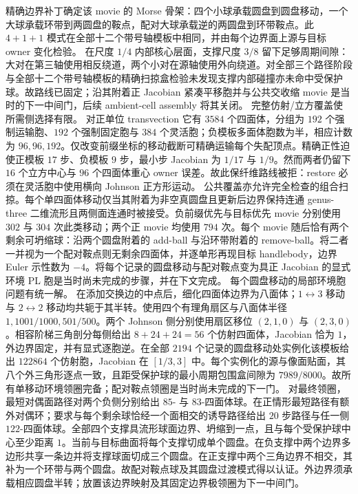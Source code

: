 \documentclass[11pt]{amsart}
\theoremstyle{definition}
\theoremstyle{remark}
\begin{document}
精确边界补丁确定该 movie 的 Morse 骨架：四个小球承载圆盘到圆盘移动，一个大球承载环带到两圆盘的鞍点，配对大球承载逆的两圆盘到环带鞍点。此 $4+1+1$ 模式在全部十二个带号轴模板中相同，并由每个边界面上源与目标 owner 变化检验。
在尺度 $1/4$ 内部核心层面，支撑尺度 $3/8$ 留下足够周期间隙：大对在第三轴使用相反绕道，两个小对在源轴使用外向绕道。对全部三个路径阶段与全部十二个带号轴模板的精确扫掠盒检验未发现支撑内部碰撞亦未命中受保护球。故路线已固定；沿其附着正 Jacobian 紧凑平移胞并与公共交收缩 movie 是当时的下一中间门，后续 ambient-cell assembly 将其关闭。
完整仿射/立方覆盖使所需侧选择有限。
对正单位 transvection 它有 $3584$ 个四面体，分组为 $192$ 个强制运输胞、$192$ 个强制固定胞与 $384$ 个灵活胞；负模板多面体胞数为半，相应计数为 $96,96,192$。仅改变前缀坐标的移动截断可精确运输每个失配顶点。精确正性迫使正模板 $17$ 步、负模板 $9$ 步，最小步 Jacobian 为 $1/17$ 与 $1/9$。然而两者仍留下 $16$ 个立方中心与 $96$ 个四面体重心 owner 误差。故此保纤维路线被拒：restore 必须在灵活胞中使用横向 Johnson 正方形运动。
公共覆盖亦允许完全检查的组合扫掠。每个单四面体移动仅当其附着为非空真圆盘且更新后边界保持连通 genus-three 二维流形且两侧面连通时被接受。负前缀优先与目标优先 movie 分别使用 $302$ 与 $304$ 次此类移动；两个正 movie 均使用 $794$ 次。每个 movie 随后恰有两个剩余可坍缩球：沿两个圆盘附着的 add-ball 与沿环带附着的 remove-ball。将二者一并视为一个配对鞍点则无剩余四面体，并逐单形再现目标 handlebody，边界 Euler 示性数为 $-4$。将每个记录的圆盘移动与配对鞍点变为具正 Jacobian 的显式环境 PL 胞是当时尚未完成的步骤，并在下文完成。
每个圆盘移动的局部环境胞问题有统一解。
在添加交换边的中点后，细化四面体边界为八面体；$1\leftrightarrow3$ 移动与
$2\leftrightarrow2$ 移动均共轭于其半转。使用四个有理角扇区与八面体半径 $1,1001/1000,501/500$。两个 Johnson 侧分别使用扇区移位 $(2,1,0)$ 与 $(2,3,0)$。相容阶梯三角剖分每侧给出 $8+24+24=56$ 个仿射四面体，Jacobian 恰为 $1$，外边界固定，并有显式逐胞逆。在全部 $2194$ 个记录的圆盘移动处实例化该模板给出 $122864$ 个仿射胞，Jacobian 在 $[1/3,3]$ 中。每个实例化的源与像面贴面，其八个外三角形逐点一致，且距受保护球的最小周期包围盒间隙为
$7989/8000$。故所有单移动环境领圈完备；配对鞍点领圈是当时尚未完成的下一门。
对最终领圈，最短对偶面路径对两个负侧分别给出 $85$- 与
$83$-四面体球。在正情形最短路径有额外对偶环；要求与每个剩余球恰经一个面相交的诱导路径给出 $20$ 步路径与任一侧 $122$-四面体球。全部四个支撑具流形球面边界、坍缩到一点，且与每个受保护球中心至少距离 $1$。当前与目标曲面将每个支撑切成单个圆盘。在负支撑中两个边界多边形共享一条边并将支撑球面切成三个圆盘。在正支撑中两个三角边界不相交，其补为一个环带与两个圆盘。故配对鞍点球及其圆盘过渡模式得以认证。外边界须承载相应圆盘半转；放置该边界映射及其固定边界极领圈为下一中间门。
\end{document}
